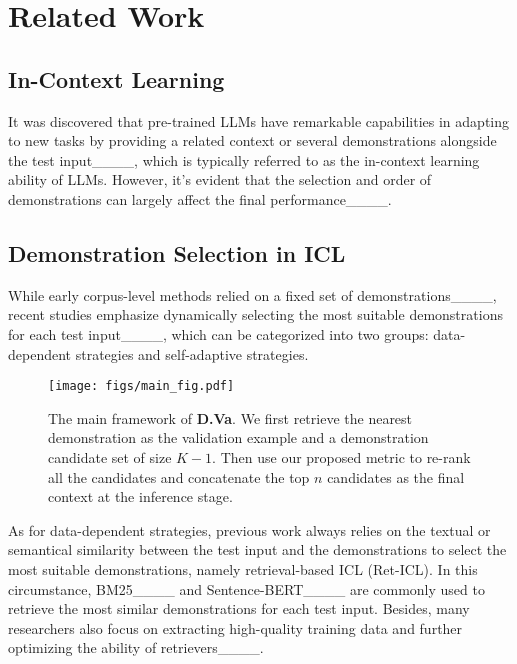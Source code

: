 \section{Related Work}
\subsection{In-Context Learning}
    It was discovered that pre-trained LLMs have remarkable capabilities in adapting to new tasks by providing a related context or several demonstrations alongside the test input____, which is typically referred to as the in-context learning ability of LLMs. However, it's evident that the selection and order of demonstrations can largely affect the final performance____.

    \subsection{Demonstration Selection in ICL}
     While early corpus-level methods relied on a fixed set of demonstrations____, recent studies emphasize dynamically selecting the most suitable demonstrations for each test input____, which can be categorized into two groups: data-dependent strategies and self-adaptive strategies.

    \begin{figure*}[h]
        \centering
        \texttt{[image: figs/main\_fig.pdf]}
        \caption{The main framework of \textbf{D.Va}. We first retrieve the nearest demonstration as the validation example and a demonstration candidate set of size $K-1$. Then use our proposed metric to re-rank all the candidates and concatenate the top $n$ candidates as the final context at the inference stage.}
        \label{fig:main}
    \end{figure*}

    As for data-dependent strategies, previous work always relies on the textual or semantical similarity between the test input and the demonstrations to select the most suitable demonstrations, namely retrieval-based ICL (Ret-ICL). In this circumstance, BM25____ and Sentence-BERT____ are commonly used to retrieve the most similar demonstrations for each test input. Besides, many researchers also focus on extracting high-quality training data and further optimizing the ability of retrievers____.

